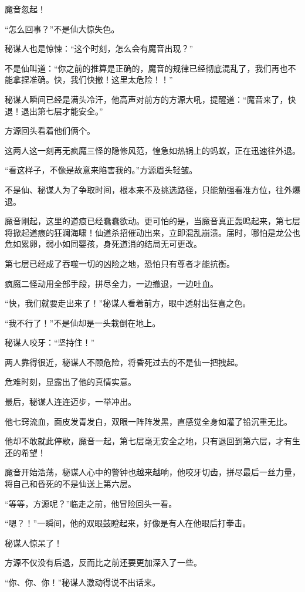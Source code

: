 \begin{this_body}
魔音忽起！

“怎么回事？”不是仙大惊失色。

秘谋人也是惊悚：“这个时刻，怎么会有魔音出现？”

不是仙叫道：“你之前的推算是正确的，魔音的规律已经彻底混乱了，我们再也不能拿捏准确。快，我们快撤！这里太危险！！”

秘谋人瞬间已经是满头冷汗，他高声对前方的方源大吼，提醒道：“魔音来了，快退！退出第七层才能安全。”

方源回头看着他们俩个。

这两人这一刻再无疯魔三怪的隐修风范，惶急如热锅上的蚂蚁，正在迅速往外退。

“看这样子，不像是故意来陷害我的。”方源眉头轻皱。

不是仙、秘谋人为了争取时间，根本来不及挑选路径，只能勉强看准方位，往外爆退。

魔音刚起，这里的道痕已经蠢蠢欲动。更可怕的是，当魔音真正轰鸣起来，第七层将掀起道痕的狂澜海啸！仙道杀招催动出来，立即混乱崩溃。届时，哪怕是龙公也危如累卵，弱小如同婴孩，身死道消的结局无可更改。

第七层已经成了吞噬一切的凶险之地，恐怕只有尊者才能抗衡。

疯魔二怪动用全部手段，拼尽全力，一边撤退，一边吐血。

“快，我们就要走出来了！”秘谋人看着前方，眼中透射出狂喜之色。

“我不行了！”不是仙却是一头栽倒在地上。

秘谋人咬牙：“坚持住！”

两人靠得很近，秘谋人不顾危险，将昏死过去的不是仙一把拽起。

危难时刻，显露出了他的真情实意。

最后，秘谋人连连迈步，一举冲出。

他七窍流血，面皮发青发白，双眼一阵阵发黑，直感觉全身如灌了铅沉重无比。

他却不敢就此停歇，魔音一起，第七层毫无安全之地，只有退回到第六层，才有生还的希望！

魔音开始浩荡，秘谋人心中的警钟也越来越响，他咬牙切齿，拼尽最后一丝力量，将自己和昏死的不是仙送上第六层。

“等等，方源呢？”临走之前，他冒险回头一看。

“嗯？！”一瞬间，他的双眼鼓瞪起来，好像是有人在他眼后打拳击。

秘谋人惊呆了！

方源不仅没有后退，反而比之前还要更加深入了一些。

“你、你、你！”秘谋人激动得说不出话来。


\end{this_body}
